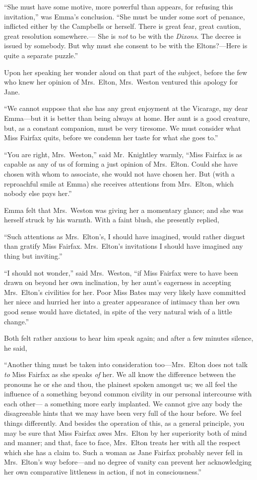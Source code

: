 ``She must have some motive, more powerful than appears, for refusing
this invitation,'' was Emma's conclusion.  ``She must be under some
sort of penance, inflicted either by the Campbells or herself.
There is great fear, great caution, great resolution somewhere.---%
She is \emph{not} to be with the \emph{Dixons}.  The decree is issued by somebody.
But why must she consent to be with the Eltons?---Here is quite a
separate puzzle.''

Upon her speaking her wonder aloud on that part of the subject,
before the few who knew her opinion of Mrs.\ Elton, Mrs.\ Weston
ventured this apology for Jane.

``We cannot suppose that she has any great enjoyment at the Vicarage,
my dear Emma---but it is better than being always at home.
Her aunt is a good creature, but, as a constant companion,
must be very tiresome.  We must consider what Miss Fairfax quits,
before we condemn her taste for what she goes to.''

``You are right, Mrs.\ Weston,'' said Mr.\ Knightley warmly, ``Miss Fairfax
is as capable as any of us of forming a just opinion of Mrs.\ Elton.
Could she have chosen with whom to associate, she would not have
chosen her.  But (with a reproachful smile at Emma) she receives
attentions from Mrs.\ Elton, which nobody else pays her.''

Emma felt that Mrs.\ Weston was giving her a momentary glance;
and she was herself struck by his warmth.  With a faint blush,
she presently replied,

``Such attentions as Mrs.\ Elton's, I should have imagined,
would rather disgust than gratify Miss Fairfax.  Mrs.\ Elton's
invitations I should have imagined any thing but inviting.''

``I should not wonder,'' said Mrs.\ Weston, ``if Miss Fairfax were to have
been drawn on beyond her own inclination, by her aunt's eagerness
in accepting Mrs.\ Elton's civilities for her.  Poor Miss Bates may
very likely have committed her niece and hurried her into a greater
appearance of intimacy than her own good sense would have dictated,
in spite of the very natural wish of a little change.''

Both felt rather anxious to hear him speak again; and after a few
minutes silence, he said,

``Another thing must be taken into consideration too---Mrs.\ Elton
does not talk \emph{to} Miss Fairfax as she speaks \emph{of} her.  We all know
the difference between the pronouns he or she and thou, the plainest
spoken amongst us; we all feel the influence of a something beyond
common civility in our personal intercourse with each other---%
a something more early implanted.  We cannot give any body the
disagreeable hints that we may have been very full of the hour before.
We feel things differently.  And besides the operation of this,
as a general principle, you may be sure that Miss Fairfax awes
Mrs.\ Elton by her superiority both of mind and manner; and that,
face to face, Mrs.\ Elton treats her with all the respect which she
has a claim to.  Such a woman as Jane Fairfax probably never fell
in Mrs.\ Elton's way before---and no degree of vanity can prevent
her acknowledging her own comparative littleness in action, if not
in consciousness.''

